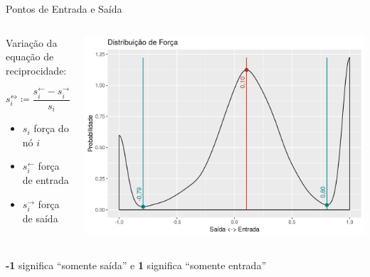 \documentclass[10pt, hyperref={pdfpagelabels=false}]{beamer}
\newcommand{\defn}{\coloneqq} %
\newcommand{\linkin}[1]{#1^\leftarrow} %
\newcommand{\linkout}[1]{#1^\rightarrow} %
\newcommand{\recboth}[1]{#1^\leftrightsquigarrow} %
\begin{document}
\begin{frame}[label=hipotese-pontos-entrada-e-saida]{Pontos de Entrada e Saída}
  \begin{center}
    \begin{columns}[T,onlytextwidth]
      \begin{column}{0.5\textwidth}
        Variação da equação de reciprocidade:
        
        \begin{equation*}
          \recboth{s_i} \defn \frac{\linkin{s_i} - \linkout{s_i}}{s_i}
        \end{equation*}
        
        \begin{itemize}
          \item[] $s_i$ força do nó $i$
          \item[] $\linkin{s_i}$ força de entrada
          \item[] $\linkout{s_i}$ força de saída
        \end{itemize}
      \end{column}
    
      \begin{column}{0.5\textwidth}
        \includegraphics[width=\textwidth]{distribuicao-de-forca}
      \end{column}
    \end{columns}
  
    \vspace{\baselineskip}
  
    \textbf{-1} significa \enquote{somente saída} e \textbf{1} significa \enquote{somente entrada}
  \end{center}
\end{frame}
\end{document}
